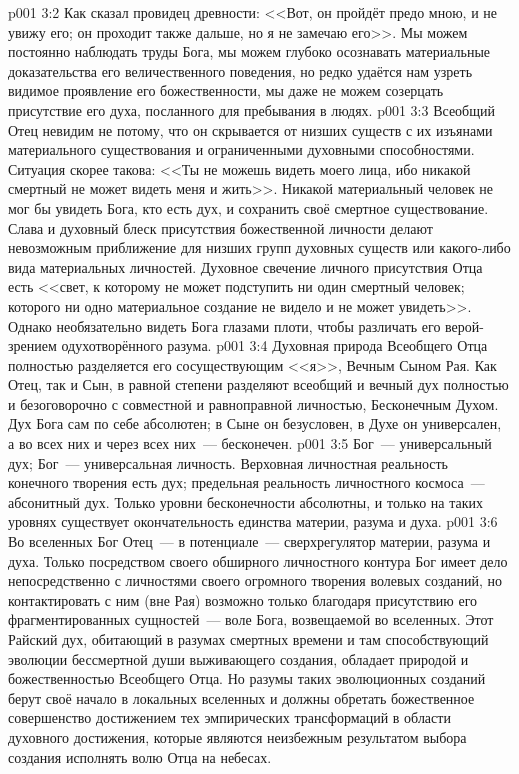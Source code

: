 \vs p001 3:2 Как сказал провидец древности: <<Вот, он пройдёт предо мною, и не увижу его; он проходит также дальше, но я не замечаю его>>. Мы можем постоянно наблюдать труды Бога, мы можем глубоко осознавать материальные доказательства его величественного поведения, но редко удаётся нам узреть видимое проявление его божественности, мы даже не можем созерцать присутствие его духа, посланного для пребывания в людях.
\vs p001 3:3 Всеобщий Отец невидим не потому, что он скрывается от низших существ с их изъянами материального существования и ограниченными духовными способностями. Ситуация скорее такова: <<Ты не можешь видеть моего лица, ибо никакой смертный не может видеть меня и жить>>. Никакой материальный человек не мог бы увидеть Бога, кто есть дух, и сохранить своё смертное существование. Слава и духовный блеск присутствия божественной личности делают невозможным приближение для низших групп духовных существ или какого\hyp{}либо вида материальных личностей. Духовное свечение личного присутствия Отца есть <<свет, к которому не может подступить ни один смертный человек; которого ни одно материальное создание не видело и не может увидеть>>. Однако необязательно видеть Бога глазами плоти, чтобы различать его верой\hyp{}зрением одухотворённого разума.
\vs p001 3:4 \pc Духовная природа Всеобщего Отца полностью разделяется его сосуществующим <<я>>, Вечным Сыном Рая. Как Отец, так и Сын, в равной степени разделяют всеобщий и вечный дух полностью и безоговорочно с совместной и равноправной личностью, Бесконечным Духом. Дух Бога сам по себе абсолютен; в Сыне он безусловен, в Духе он универсален, а во всех них и через всех них~--- бесконечен.
\vs p001 3:5 \pc Бог~--- универсальный дух; Бог~--- универсальная личность. Верховная личностная реальность конечного творения есть дух; предельная реальность личностного космоса~--- абсонитный дух. Только уровни бесконечности абсолютны, и только на таких уровнях существует окончательность единства материи, разума и духа.
\vs p001 3:6 \pc Во вселенных Бог Отец~--- в потенциале~--- сверхрегулятор материи, разума и духа. Только посредством своего обширного личностного контура Бог имеет дело непосредственно с личностями своего огромного творения волевых созданий, но контактировать с ним (вне Рая) возможно только благодаря присутствию его фрагментированных сущностей~--- воле Бога, возвещаемой во вселенных. Этот Райский дух, обитающий в разумах смертных времени и там способствующий эволюции бессмертной души выживающего создания, обладает природой и божественностью Всеобщего Отца. Но разумы таких эволюционных созданий берут своё начало в локальных вселенных и должны обретать божественное совершенство достижением тех эмпирических трансформаций в области духовного достижения, которые являются неизбежным результатом выбора создания исполнять волю Отца на небесах.
